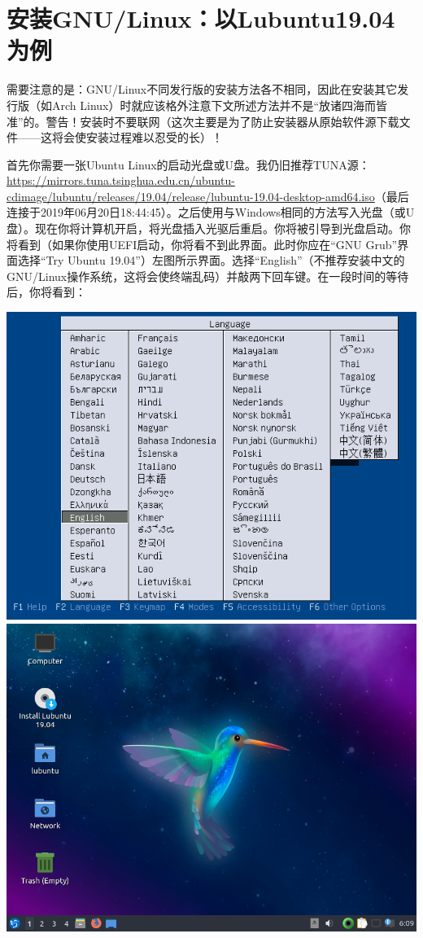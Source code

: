\section{安装GNU/Linux：以Lubuntu19.04为例}
需要注意的是：GNU/Linux不同发行版的安装方法各不相同，因此在安装其它发行版（如Arch Linux）时就应该格外注意下文所述方法并不是“放诸四海而皆准”的。警告！安装时不要联网（这次主要是为了防止安装器从原始软件源下载文件——这将会使安装过程难以忍受的长）！\par
首先你需要一张Ubuntu Linux的启动光盘或U盘。我仍旧推荐TUNA源：\url{https://mirrors.tuna.tsinghua.edu.cn/ubuntu-cdimage/lubuntu/releases/19.04/release/lubuntu-19.04-desktop-amd64.iso}（最后连接于2019年06月20日18:44:45）。之后使用与Windows相同的方法写入光盘（或U盘）。现在你将计算机开启，将光盘插入光驱后重启。你将被引导到光盘启动。你将看到（如果你使用UEFI启动，你将看不到此界面。此时你应在“GNU Grub”界面选择“Try Ubuntu 19.04”）左图所示界面。选择“English”（不推荐安装中文的GNU/Linux操作系统，这将会使终端乱码）并敲两下回车键。在一段时间的等待后，你将看到：
\begin{center}
	\includegraphics[scale=0.5]{pic/lubinst1}	\includegraphics[scale=0.4]{pic/lubinst2}
\end{center} \par
